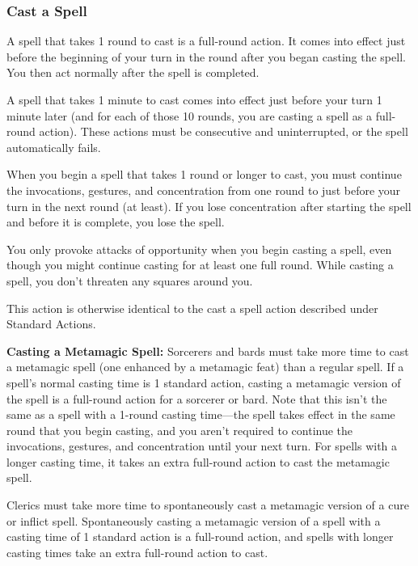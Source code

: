 \subsubsection{Cast a Spell}
A spell that takes 1 round to cast is a full-round action. It comes into effect just before the beginning of your turn in the round after you began casting the spell. You then act normally after the spell is completed.

A spell that takes 1 minute to cast comes into effect just before your turn 1 minute later (and for each of those 10 rounds, you are casting a spell as a full-round action). These actions must be consecutive and uninterrupted, or the spell automatically fails.

When you begin a spell that takes 1 round or longer to cast, you must continue the invocations, gestures, and concentration from one round to just before your turn in the next round (at least). If you lose concentration after starting the spell and before it is complete, you lose the spell.

You only provoke attacks of opportunity when you begin casting a spell, even though you might continue casting for at least one full round. While casting a spell, you don't threaten any squares around you.

This action is otherwise identical to the cast a spell action described under Standard Actions.

\textbf{Casting a Metamagic Spell:} Sorcerers and bards must take more time to cast a metamagic spell (one enhanced by a metamagic feat) than a regular spell. If a spell's normal casting time is 1 standard action, casting a metamagic version of the spell is a full-round action for a sorcerer or bard. Note that this isn't the same as a spell with a 1-round casting time---the spell takes effect in the same round that you begin casting, and you aren't required to continue the invocations, gestures, and concentration until your next turn. For spells with a longer casting time, it takes an extra full-round action to cast the metamagic spell.

Clerics must take more time to spontaneously cast a metamagic version of a cure or inflict spell. Spontaneously casting a metamagic version of a spell with a casting time of 1 standard action is a full-round action, and spells with longer casting times take an extra full-round action to cast.